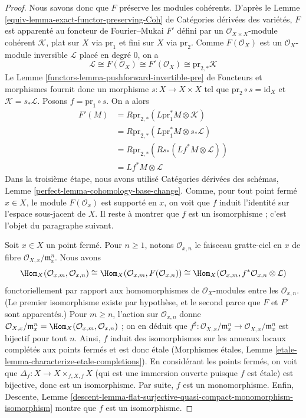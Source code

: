 \begin{proof}
\medskip\noindent
Nous savons donc que $F$ préserve les modules cohérents. D'après le Lemme
\ref{equiv-lemma-exact-functor-preserving-Coh} de Catégories dérivées des
variétés, $F$ est apparenté au foncteur de Fourier--Mukai $F'$ défini par
un $\mathcal{O}_{X \times X}$-module cohérent $\mathcal{K}$, plat sur
$X$ via $\text{pr}_1$ et fini sur $X$ via $\text{pr}_2$. Comme
$F(\mathcal{O}_X)$ est un $\mathcal{O}_X$-module inversible
$\mathcal{L}$ placé en degré $0$, on a
$$
\mathcal{L} \cong F(\mathcal{O}_X) \cong F'(\mathcal{O}_X) \cong
\text{pr}_{2, *}\mathcal{K}
$$
Le Lemme \ref{functors-lemma-pushforward-invertible-pre} de Foncteurs et
morphismes fournit donc un morphisme $s : X \to X \times X$ tel que
$\text{pr}_2 \circ s = \text{id}_X$ et $\mathcal{K} = s_*\mathcal{L}$.
Posons $f = \text{pr}_1 \circ s$. On a alors
\begin{align*}
F'(M)
& =
R\text{pr}_{2, *}(L\text{pr}_1^*M \otimes \mathcal{K}) \\
& =
R\text{pr}_{2, *}(L\text{pr}_1^*M \otimes s_*\mathcal{L}) \\
& =
R\text{pr}_{2, *}(Rs_*(Lf^*M \otimes \mathcal{L})) \\
& =
Lf^*M \otimes \mathcal{L}
\end{align*}
Dans la troisième étape, nous avons utilisé Catégories dérivées des
schémas, Lemme \ref{perfect-lemma-cohomology-base-change}.
Comme, pour tout point fermé $x \in X$, le module
$F(\mathcal{O}_x)$ est supporté en $x$, on voit que $f$ induit l'identité
sur l'espace sous-jacent de $X$. Il reste à montrer que $f$
est un isomorphisme ; c'est l'objet du paragraphe suivant.

\medskip\noindent
Soit $x \in X$ un point fermé. Pour $n \geq 1$, notons
$\mathcal{O}_{x, n}$ le faisceau gratte-ciel en $x$ de fibre
$\mathcal{O}_{X, x}/\mathfrak m_x^n$. Nous avons
$$
\Hom_X(\mathcal{O}_{x, m}, \mathcal{O}_{x, n}) \cong
\Hom_X(\mathcal{O}_{x, m}, F(\mathcal{O}_{x, n})) \cong
\Hom_X(\mathcal{O}_{x, m}, f^*\mathcal{O}_{x, n} \otimes \mathcal{L})
$$
fonctoriellement par rapport aux homomorphismes de $\mathcal{O}_X$-modules
entre les $\mathcal{O}_{x, n}$. (Le premier isomorphisme existe par
hypothèse, et le second parce que $F$ et $F'$ sont apparentés.) Pour
$m \geq n$, l'action sur $\mathcal{O}_{x, n}$ donne
$\mathcal{O}_{X, x}/\mathfrak m_x^n =
\Hom_X(\mathcal{O}_{x, m}, \mathcal{O}_{x, n})$ ; on en déduit que
$f^\sharp : \mathcal{O}_{X, x}/\mathfrak m_x^n \to
\mathcal{O}_{X, x}/\mathfrak m_x^n$ est bijectif pour tout $n$. Ainsi,
$f$ induit des isomorphismes sur les anneaux locaux complétés aux points
fermés et est donc étale (Morphismes étales, Lemme
\ref{etale-lemma-characterize-etale-completions}). En considérant les
points fermés, on voit que
$\Delta_f : X \to X \times_{f, X, f} X$ (qui est une immersion ouverte
puisque $f$ est étale) est bijective, donc est un isomorphisme. Par suite,
$f$ est un monomorphisme. Enfin, Descente, Lemme
\ref{descent-lemma-flat-surjective-quasi-compact-monomorphism-isomorphism}
montre que $f$ est un isomorphisme.
\end{proof}








